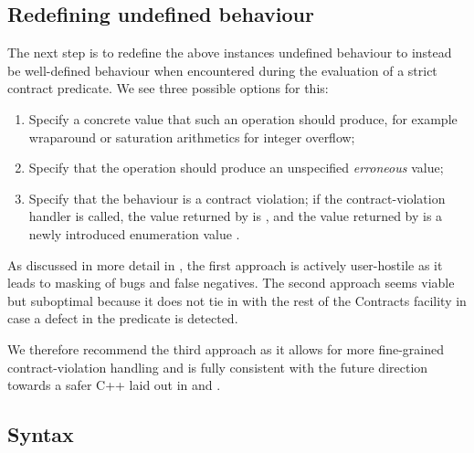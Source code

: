 \subsection{Redefining undefined behaviour}

The next step is to redefine the above instances undefined behaviour to instead be well-defined behaviour when encountered during the evaluation of a strict contract predicate. We see three possible options for this:
\begin{enumerate}
\item Specify a concrete value that such an operation should produce, for example wraparound or saturation arithmetics for integer overflow;
\item Specify that the operation should produce an unspecified \emph{erroneous} value;
\item Specify that the behaviour is a contract violation; if the contract-violation handler is called, the value returned by  is , and the value returned by  is a newly introduced enumeration value .
\end{enumerate}
As discussed in more detail in \cite{P3386R0}, the first approach is actively user-hostile as it leads to masking of bugs and false negatives. The second approach seems viable but suboptimal because it does not tie in with the rest of the Contracts facility in case a defect in the predicate is detected.

We therefore recommend the third approach as it allows for more fine-grained contract-violation handling and is fully consistent with the future direction towards a safer C++ laid out in \cite{P3100R1} and \cite{P3229R0}.

\subsection{Syntax}


